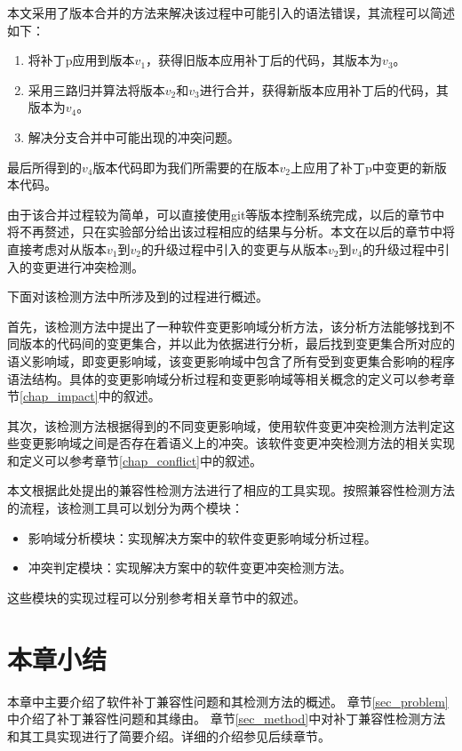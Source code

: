 本文采用了版本合并的方法来解决该过程中可能引入的语法错误，其流程可以简述如下：
\begin{enumerate}
	\item 将补丁p应用到版本$v_1$，获得旧版本应用补丁后的代码，其版本为$v_3$。
	\item 采用三路归并算法将版本$v_2$和$v_3$进行合并，获得新版本应用补丁后的代码，其版本为$v_4$。
	\item 解决分支合并中可能出现的冲突问题。
\end{enumerate}

最后所得到的$v_4$版本代码即为我们所需要的在版本$v_2$上应用了补丁p中变更的新版本代码。

由于该合并过程较为简单，可以直接使用git等版本控制系统完成，以后的章节中将不再赘述，只在实验部分给出该过程相应的结果与分析。本文在以后的章节中将直接考虑对从版本$v_1$到$v_2$的升级过程中引入的变更与从版本$v_2$到$v_4$的升级过程中引入的变更进行冲突检测。

下面对该检测方法中所涉及到的过程进行概述。

首先，该检测方法中提出了一种软件变更影响域分析方法，该分析方法能够找到不同版本的代码间的变更集合，并以此为依据进行分析，最后找到变更集合所对应的语义影响域，即变更影响域，该变更影响域中包含了所有受到变更集合影响的程序语法结构。具体的变更影响域分析过程和变更影响域等相关概念的定义可以参考章节\ref {chap_impact}中的叙述。

其次，该检测方法根据得到的不同变更影响域，使用软件变更冲突检测方法判定这些变更影响域之间是否存在着语义上的冲突。该软件变更冲突检测方法的相关实现和定义可以参考章节\ref {chap_conflict}中的叙述。

本文根据此处提出的兼容性检测方法进行了相应的工具实现。按照兼容性检测方法的流程，该检测工具可以划分为两个模块：
\begin{itemize}
	\item 影响域分析模块：实现解决方案中的软件变更影响域分析过程。
	\item 冲突判定模块：实现解决方案中的软件变更冲突检测方法。
\end{itemize}

这些模块的实现过程可以分别参考相关章节中的叙述。

\section{本章小结}
本章中主要介绍了软件补丁兼容性问题和其检测方法的概述。
章节\ref {sec_problem}中介绍了补丁兼容性问题和其缘由。
章节\ref {sec_method}中对补丁兼容性检测方法和其工具实现进行了简要介绍。详细的介绍参见后续章节。


